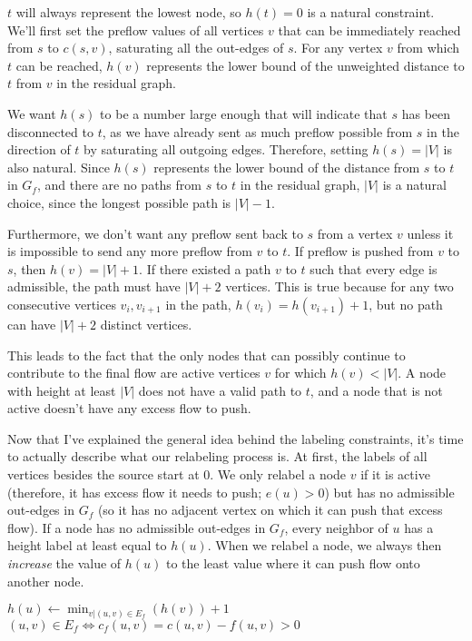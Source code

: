 $t$ will always represent the lowest node, so $h(t)=0$ is a natural constraint. We'll first set the preflow values of all vertices $v$ that can be immediately reached from $s$ to $c(s,v)$, saturating all the out-edges of $s$. For any vertex $v$ from which $t$ can be reached, $h(v)$ represents the lower bound of the unweighted distance to $t$ from $v$ in the residual graph.

We want $h(s)$ to be a number large enough that will indicate that $s$ has been disconnected to $t$, as we have already sent as much preflow possible from $s$ in the direction of $t$ by saturating all outgoing edges. Therefore, setting $h(s)=|V|$ is also natural. Since $h(s)$ represents the lower bound of the distance from $s$ to $t$ in $G_f$, and there are no paths from $s$ to $t$ in the residual graph, $|V|$ is a natural choice, since the longest possible path is $|V|-1$.

Furthermore, we don't want any preflow sent back to $s$ from a vertex $v$ unless it is impossible to send any more preflow from $v$ to $t$. If preflow is pushed from $v$ to $s$, then $h(v) = |V| + 1$. If there existed a path $v$ to $t$ such that every edge is admissible, the path must have $|V| + 2$ vertices. This is true because for any two consecutive vertices $v_i,v_{i+1}$ in the path, $h(v_i) = h(v_{i+1}) + 1$, but no path can have $|V|+2$ distinct vertices.

This leads to the fact that the only nodes that can possibly continue to contribute to the final flow are active vertices $v$ for which $h(v) < |V|$. A node with height at least $|V|$ does not have a valid path to $t$, and a node that is not active doesn't have any excess flow to push.

Now that I've explained the general idea behind the labeling constraints, it's time to actually describe what our relabeling process is. At first, the labels of all vertices besides the source start at 0. We only relabel a node $v$ if it is active (therefore, it has excess flow it needs to push; $e(u) > 0$) but has no admissible out-edges in $G_f$ (so it has no adjacent vertex on which it can push that excess flow). If a node has no admissible out-edges in $G_f$, every neighbor of $u$ has a height label at least equal to $h(u)$. When we relabel a node, we always then \textit{increase} the value of $h(u)$ to the least value where it can push flow onto another node.

\noindent \begin{minipage}{\textwidth}
\begin{algorithmic}
		\State $h(u) \gets \min_{v | (u,v) \in E_f}(h(v)) + 1$
		\Comment $(u,v) \in E_f \iff c_f(u,v) = c(u,v) - f(u,v) > 0$
\EndFunction
\end{algorithmic}
\end{minipage}

